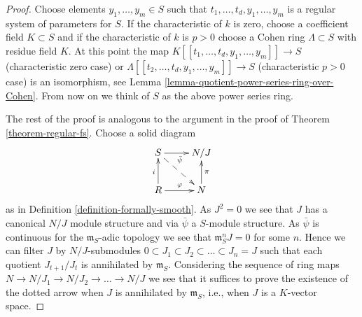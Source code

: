 \documentclass[10pt,a4paper]{amsart}
\theoremstyle{plain}
\theoremstyle{definition}
\theoremstyle{remark}
\numberwithin{equation}{subsection}
\begin{document}
\begin{proof}
\medskip\noindent
Choose elements $y_1, \ldots, y_m \in S$ such that
$t_1, \ldots, t_d, y_1, \ldots, y_m$ is a regular system of parameters
for $S$. If the characteristic of $k$ is zero, choose a coefficient
field $K \subset S$ and if the characteristic of $k$ is $p > 0$
choose a Cohen ring $\Lambda \subset S$ with residue field $K$.
At this point the map $K[[t_1, \ldots, t_d, y_1, \ldots, y_m]] \to S$
(characteristic zero case) or
$\Lambda[[t_2, \ldots, t_d, y_1, \ldots, y_m]] \to S$
(characteristic $p > 0$ case) is an isomorphism, see
Lemma \ref{lemma-quotient-power-series-ring-over-Cohen}.
From now on we think of $S$ as the above power series ring.

\medskip\noindent
The rest of the proof is analogous to the argument
in the proof of Theorem \ref{theorem-regular-fs}. Choose a solid diagram
$$
\xymatrix{
S \ar[r]_{\bar\psi} \ar@{-->}[rd] & N/J \\
R \ar[u]^i \ar[r]^\varphi & N \ar[u]_\pi
}
$$
as in Definition \ref{definition-formally-smooth}. As $J^2 = 0$ we see
that $J$ has a canonical $N/J$ module structure and via $\bar\psi$ a
$S$-module structure. As $\bar\psi$ is continuous for the
$\mathfrak m_S$-adic topology we see that $\mathfrak m_S^nJ = 0$ for some
$n$. Hence we can filter $J$ by $N/J$-submodules
$0 \subset J_1 \subset J_2 \subset \ldots \subset J_n = J$
such that each quotient $J_{t + 1}/J_t$ is annihilated by $\mathfrak m_S$.
Considering the sequence of ring maps
$N \to N/J_1 \to N/J_2 \to \ldots \to N/J$
we see that it suffices to prove the existence of the dotted arrow when
$J$ is annihilated by $\mathfrak m_S$, i.e., when $J$ is a
$K$-vector space.


\end{proof}
\end{document}

